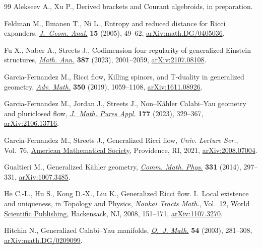 \documentclass[11pt]{article}
\numberwithin{equation}{section}
\numberwithin{equation}{section}
\begin{document}
\begin{thebibliography}{99}
Alekseev A., Xu P., Derived brackets and {C}ourant algebroids, {i}n
 preparation.

Feldman M., Ilmanen T., Ni L., Entropy and reduced distance for {R}icci
 expanders, \href{https://doi.org/10.1007/BF02921858}{\textit{J.~Geom. Anal.}} \textbf{15} (2005), 49--62,
 \href{https://arxiv.org/abs/math.DG/0405036}{arXiv:math.DG/0405036}.

Fu X., Naber A., Streets J., Codimension four regularity of generalized
 {E}instein structures, \href{https://doi.org/10.1007/s00208-022-02516-3}{\textit{Math. Ann.}} \textbf{387} (2023), 2001--2059,
 \href{https://arxiv.org/abs/2107.08108}{arXiv:2107.08108}.

Garcia-Fernandez M., Ricci flow, {K}illing spinors, and {T}-duality in
 generalized geometry, \href{https://doi.org/10.1016/j.aim.2019.04.038}{\textit{Adv. Math.}} \textbf{350} (2019), 1059--1108,
 \href{https://arxiv.org/abs/1611.08926}{arXiv:1611.08926}.

Garcia-Fernandez M., Jordan J., Streets J., Non--{K}\"ahler {C}alabi--{Y}au
 geometry and pluriclosed flow, \href{https://doi.org/10.1016/j.matpur.2023.07.002}{\textit{J.~Math. Pures Appl.}} \textbf{177}
 (2023), 329--367, \href{https://arxiv.org/abs/2106.13716}{arXiv:2106.13716}.

Garcia-Fernandez M., Streets J., Generalized {R}icci flow, \textit{Univ.
 Lecture Ser.}, Vol.~76, \href{https://doi.org/10.1090/ulect/076}{American Mathematical Society}, Providence, RI, 2021,
 \href{https://arxiv.org/abs/2008.07004}{arXiv:2008.07004}.

Gualtieri M., Generalized {K}\"ahler geometry, \href{https://doi.org/10.1007/s00220-014-1926-z}{\textit{Comm. Math. Phys.}}
 \textbf{331} (2014), 297--331, \href{https://arxiv.org/abs/1007.3485}{arXiv:1007.3485}.

He C.-L., Hu S., Kong D.-X., Liu K., Generalized {R}icci flow. {I}.~{L}ocal
 existence and uniqueness, in Topology and {P}hysics, \textit{Nankai Tracts
 Math.}, Vol.~12, \href{https://doi.org/10.1142/9789812819116_0006}{World Scientific Publishing}, Hackensack, NJ, 2008, 151--171,
 \href{https://arxiv.org/abs/1107.3270}{arXiv:1107.3270}.

Hitchin N., Generalized {C}alabi--{Y}au manifolds, \href{https://doi.org/10.1093/qjmath/54.3.281}{\textit{Q.~J. Math.}}
 \textbf{54} (2003), 281--308, \href{https://arxiv.org/abs/math.DG/0209099}{arXiv:math.DG/0209099}.


\end{thebibliography}
\end{document}
